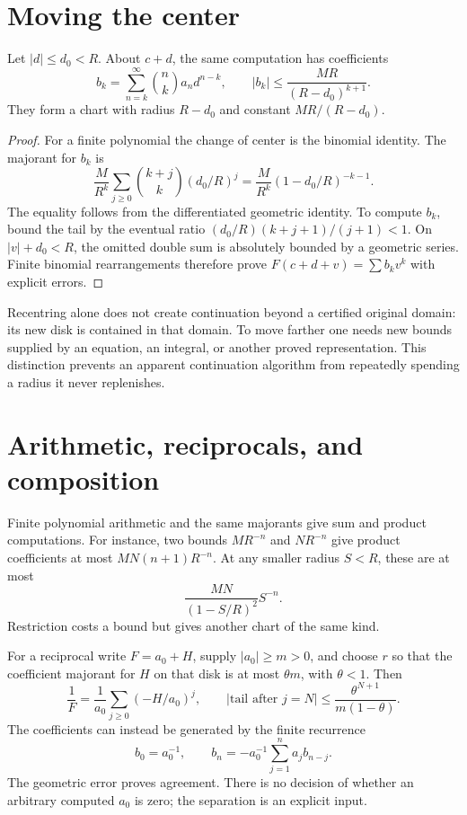 \section{Moving the center}
\begin{theorem}
\label{thm:recenter-model}
Let $|d|\le d_0<R$.  About $c+d$, the same computation has coefficients
\[
 b_k=\sum_{n=k}^{\infty}\binom nk a_nd^{n-k},
 \qquad |b_k|\le\frac{MR}{(R-d_0)^{k+1}}.
\]
They form a chart with radius $R-d_0$ and constant $MR/(R-d_0)$.
\end{theorem}
\begin{proof}
For a finite polynomial the change of center is the binomial identity.
The majorant for $b_k$ is
\[
 \frac{M}{R^k}\sum_{j\ge0}\binom{k+j}{k}(d_0/R)^j
 =\frac{M}{R^k}(1-d_0/R)^{-k-1}.
\]
The equality follows from the differentiated geometric identity.  To
compute $b_k$, bound the tail by the eventual ratio
$(d_0/R)(k+j+1)/(j+1)<1$.  On $|v|+d_0<R$, the omitted double sum is
absolutely bounded by a geometric series.  Finite binomial rearrangements
therefore prove $F(c+d+v)=\sum b_kv^k$ with explicit errors.
\end{proof}

Recentring alone does not create continuation beyond a certified original
domain: its new disk is contained in that domain.  To move farther one
needs new bounds supplied by an equation, an integral, or another proved
representation.  This distinction prevents an apparent continuation
algorithm from repeatedly spending a radius it never replenishes.

\section{Arithmetic, reciprocals, and composition}
Finite polynomial arithmetic and the same majorants give sum and product
computations.  For instance, two bounds $M R^{-n}$ and $N R^{-n}$ give
product coefficients at most $MN(n+1)R^{-n}$.  At any smaller radius
$S<R$, these are at most
\[
 \frac{MN}{(1-S/R)^2}S^{-n}.
\]
Restriction costs a bound but gives another chart of the same kind.

For a reciprocal write $F=a_0+H$, supply $|a_0|\ge m>0$, and choose $r$
so that the coefficient majorant for $H$ on that disk is at most
$\theta m$, with $\theta<1$.  Then
\[
 \frac1F=\frac1{a_0}\sum_{j\ge0}(-H/a_0)^j,
 \qquad
 \left|\text{tail after }j=N\right|
 \le\frac{\theta^{N+1}}{m(1-\theta)}.
\]
The coefficients can instead be generated by the finite recurrence
\[
 b_0=a_0^{-1},\qquad
 b_n=-a_0^{-1}\sum_{j=1}^na_jb_{n-j}.
\]
The geometric error proves agreement.  There is no decision of whether an
arbitrary computed $a_0$ is zero; the separation is an explicit input.

